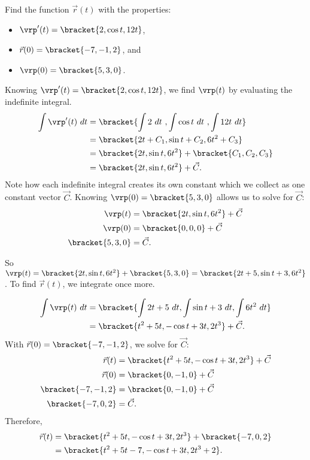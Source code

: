 \begin{example}\label{ex_vvfint2}
Find the function $\vec r(t)$ with the properties:
\begin{itemize}
	\item $\vrp'(t) =\bracket{2, \cos t, 12t}$,
	\item $\vec r(0) =\bracket{-7,-1,2}$, and
	\item	$\vrp(0) =\bracket{5,3,0}$.
\end{itemize}
\solution
Knowing $\vrp'(t) =\bracket{2,\cos t, 12t}$, we find $\vrp(t)$ by evaluating the indefinite integral.
\begin{align*}
\int \vrp'(t)\ dt &=\bracket{\int 2\ dt\ , \int \cos t\ dt\ , \int 12t\ dt}\\
						&=\bracket{2t+C_1, \sin t+ C_2, 6t^2 + C_3}\\
						&=\bracket{2t,\sin t,6t^2}+\bracket{C_1,C_2,C_3}\\
						&=\bracket{2t,\sin t,6t^2}+ \vec C.
\end{align*}
Note how each indefinite integral creates its own constant which we collect as one constant vector $\vec C$. Knowing $\vrp(0) =\bracket{5,3,0}$ allows us to solve for $\vec C$:
\begin{align*}
\vrp(t) & =\bracket{2t,\sin t,6t^2}+ \vec C\\
\vrp(0) &=\bracket{0,0,0}+ \vec C\\
\bracket{5,3,0}&= \vec C.
\end{align*}

So $\vrp(t) =\bracket{2t,\sin t,6t^2}+\bracket{5,3,0}=\bracket{2t+5, \sin t + 3, 6t^2}$. To find $\vec r(t)$, we integrate once more.

\begin{align*}
\int \vrp(t)\ dt &=\bracket{\int 2t+5\ dt, \int \sin t + 3\ dt, \int 6t^2\ dt}\\
							&=\bracket{t^2+5t, -\cos t + 3t, 2t^3}+ \vec C.
\end{align*}
With $\vec r(0) =\bracket{-7,-1,2}$, we solve for $\vec C$:
\begin{align*}
\vec r(t) &=\bracket{t^2+5t, -\cos t + 3t, 2t^3}+ \vec C\\
\vec r(0) &=\bracket{0,-1,0}+ \vec C\\
\bracket{-7,-1,2}&=\bracket{0,-1,0}+ \vec C\\
\bracket{-7,0,2}&= \vec C.
\end{align*}
Therefore,
\begin{align*}
 \vec r(t) &=\bracket{t^2+5t, -\cos t + 3t, 2t^3}+\bracket{-7,0,2}\\
 &=\bracket{t^2+5t-7,-\cos t+3t,2t^3+2}.
\end{align*}
\end{example}

